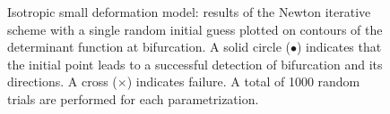 \documentclass[12pt]{article}
\numberwithin{equation}{section}
\begin{document}
\begin{figure}[!htbp]
   \centering {}   
   \caption{Isotropic small deformation model: results of the Newton
     iterative scheme with a single random initial guess plotted on
     contours of the determinant function at bifurcation. A solid
     circle ($\bullet$) indicates that the initial point leads to a
     successful detection of bifurcation and its directions. A cross
     ($\times$) indicates failure. A total of 1000 random trials are
     performed for each parametrization.}
   \label{fig:iso-shear-robust}
\end{figure}
\end{document}
